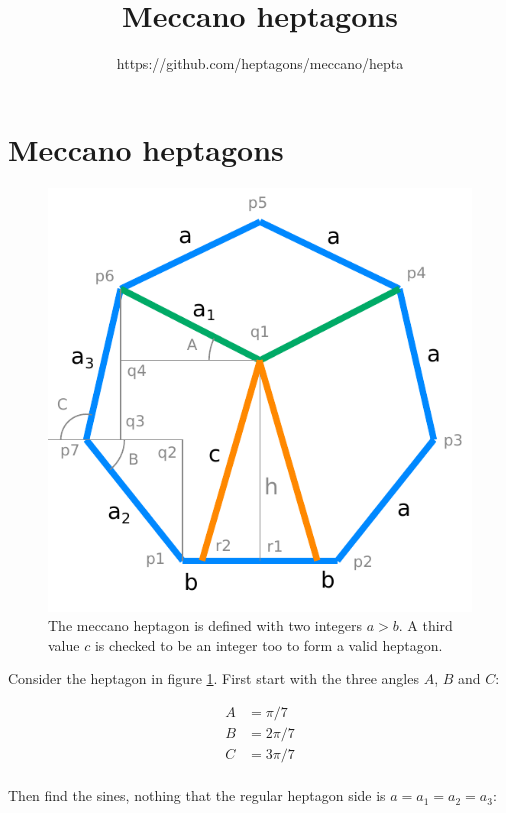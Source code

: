 \documentclass[11pt]{article}
\title{\textbf{Meccano heptagons}}
\author{https://github.com/heptagons/meccano/hepta}
\date{}
\begin{document}
\maketitle

\section{Meccano heptagons}

\begin{figure}[htp]
\centering
\includegraphics[scale=1]{figs/heptagon_plan.pdf}
\caption{The meccano heptagon is defined with two integers $a > b$. A third value $c$ is checked to be an integer too to form a valid heptagon.}
\label{heptagonplan}
\end{figure}

Consider the heptagon in figure \ref{heptagonplan}.
First start with the three angles $A$, $B$ and $C$:

\begin{align*}
A &= {\pi/7} \\
B &= {2\pi/7} \\
C &= {3\pi/7} \\
\end{align*}

Then find the sines, nothing that the regular heptagon side is $a = a_1 = a_2 = a_3$:
\end{document}

